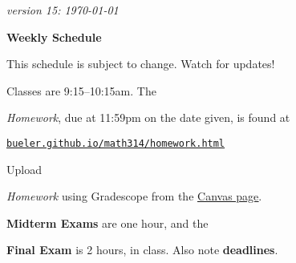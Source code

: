\documentclass[12pt]{article}
\newcommand{\due}[1]{\strut {\color{BrickRed} \textsl{#1}}}
\newcommand{\ee}[1]{\strut {\color{Blue} \textbf{#1}}}
\newcommand{\dlinline}[1]{{\color{Purple} \textbf{#1}}}
\newcommand{\dl}[1]{{\small \dlinline{#1}}}
\begin{document}
\hfill \small \emph{version 15: \today} \normalsize

\bigskip\bigskip
\centerline{\Large \textbf{Weekly Schedule}}

\bigskip
This schedule is subject to change.  Watch for updates!

Classes are 9:15--10:15am.  The \due{Homework}, due at 11:59pm on the date given, is found at

 \quad \href{https://bueler.github.io/math314/homework.html}{\underline{\texttt{bueler.github.io/math314/homework.html}}}
 
Upload \due{Homework} using Gradescope from the \href{https://canvas.alaska.edu/courses/7017}{\underline{Canvas page}}.  \ee{Midterm Exams} are one hour, and the \ee{Final Exam} is 2 hours, in class.  Also note \dl{deadlines}.

\bigskip
\end{document}
